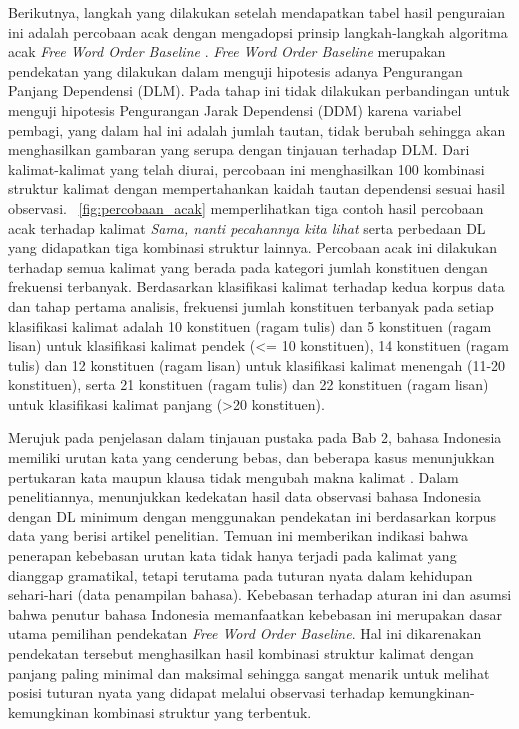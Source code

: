 Berikutnya, langkah yang dilakukan setelah mendapatkan tabel hasil penguraian ini adalah percobaan acak dengan mengadopsi prinsip langkah-langkah algoritma acak \textit{Free Word Order Baseline} \citep{futrell2015large}. \textit{Free Word Order Baseline} merupakan pendekatan yang dilakukan \cite{futrell2015large} dalam menguji hipotesis adanya Pengurangan Panjang Dependensi (DLM). Pada tahap ini tidak dilakukan perbandingan untuk menguji hipotesis Pengurangan Jarak Dependensi (DDM) karena variabel pembagi, yang dalam hal ini adalah jumlah tautan, tidak berubah sehingga akan menghasilkan gambaran yang serupa dengan tinjauan terhadap DLM. Dari kalimat-kalimat yang telah diurai, percobaan ini menghasilkan 100 kombinasi struktur kalimat dengan mempertahankan kaidah tautan dependensi sesuai hasil observasi. \pic~\ref{fig:percobaan_acak} memperlihatkan tiga contoh hasil percobaan acak terhadap kalimat \textit{Sama, nanti pecahannya kita lihat} serta perbedaan DL yang didapatkan tiga kombinasi struktur lainnya. Percobaan acak ini dilakukan terhadap semua kalimat yang berada pada kategori jumlah konstituen dengan frekuensi terbanyak. Berdasarkan klasifikasi kalimat terhadap kedua korpus data dan tahap pertama analisis, frekuensi jumlah konstituen terbanyak pada setiap klasifikasi kalimat adalah 10 konstituen (ragam tulis) dan 5 konstituen (ragam lisan) untuk klasifikasi kalimat pendek (\textless= 10 konstituen), 14 konstituen (ragam tulis) dan 12 konstituen (ragam lisan) untuk klasifikasi kalimat menengah (11-20 konstituen), serta 21 konstituen (ragam tulis) dan 22 konstituen (ragam lisan) untuk klasifikasi kalimat panjang (\textgreater 20 konstituen). 

Merujuk pada penjelasan dalam tinjauan pustaka pada Bab 2, bahasa Indonesia memiliki urutan kata yang cenderung bebas, dan beberapa kasus menunjukkan pertukaran kata maupun klausa tidak mengubah makna kalimat \citep{sneddon2010indonesian}. Dalam penelitiannya, \cite{futrell2015large} menunjukkan kedekatan hasil data observasi bahasa Indonesia dengan DL minimum dengan menggunakan pendekatan ini berdasarkan korpus data yang berisi artikel penelitian. Temuan ini memberikan indikasi bahwa penerapan kebebasan urutan kata tidak hanya terjadi pada kalimat yang dianggap gramatikal, tetapi terutama pada tuturan nyata dalam kehidupan sehari-hari (data penampilan bahasa). Kebebasan terhadap aturan ini dan asumsi bahwa penutur bahasa Indonesia memanfaatkan kebebasan ini merupakan dasar utama pemilihan pendekatan \textit{Free Word Order Baseline}. Hal ini dikarenakan pendekatan tersebut menghasilkan hasil kombinasi struktur kalimat dengan panjang paling minimal dan maksimal sehingga sangat menarik untuk melihat posisi tuturan nyata yang didapat melalui observasi terhadap kemungkinan-kemungkinan kombinasi struktur yang terbentuk. 

